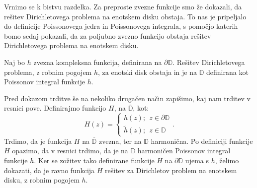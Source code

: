 \documentclass[mat1]{fmfdelo}
\begin{document}
    Vrnimo se k bistvu razdelka. Za preproste zvezne funkcije smo že dokazali, da rešitev Dirichletovega problema na enotskem disku obstaja. To nas je pripeljalo do definicije Poissonovega jedra in Poissonovega integrala, s pomočjo katerih bomo sedaj pokazali, da za poljubno zvezno funkcijo obstaja rešitev Dirichletovega problema na enotskem disku.
    \begin{trditev}
        \label{obstoj}
        Naj bo $h$ zvezna kompleksna funkcija, definirana na $\partial \mathbb{D}$. Rešitev Dirichletovega problema, z robnim pogojem $h$, za enotski disk obstaja in je na $\mathbb{D}$ definirana kot Poissonov integral funkcije $h$.
    \end{trditev}
    \begin{opomba}
        \label{opomba_obstoj}
        Pred dokazom trditve še na nekoliko drugačen način zapišimo, kaj nam trditev v resnici pove. 
        Definirajmo funkcijo $H$, na $\overline{\mathbb{D}}$, kot:
        $$
            H(z) = \begin{cases}
                    h(z);~~z \in \partial \mathbb{D}\\
                    \widetilde{h}(z);~~z \in \mathbb{D}
            \end{cases}.
        $$
        Trdimo, da je funkcija $H$ na $\overline{\mathbb{D}}$ zvezna, ter na $\mathbb{D}$ harmonična. Po definiciji funkcije $H$ opazimo, da v resnici trdimo, da je na $\mathbb{D}$ harmoničen Poissonov integral funkcije $h$. 
        Ker se zožitev tako definirane funkcije $H$ na $\partial \mathbb{D}$ ujema s $h$, želimo dokazati, da je ravno funkcija $H$ rešitev za Dirichletov problem na enotskem disku, z robnim pogojem $h$.
     \end{opomba}
\end{document}
